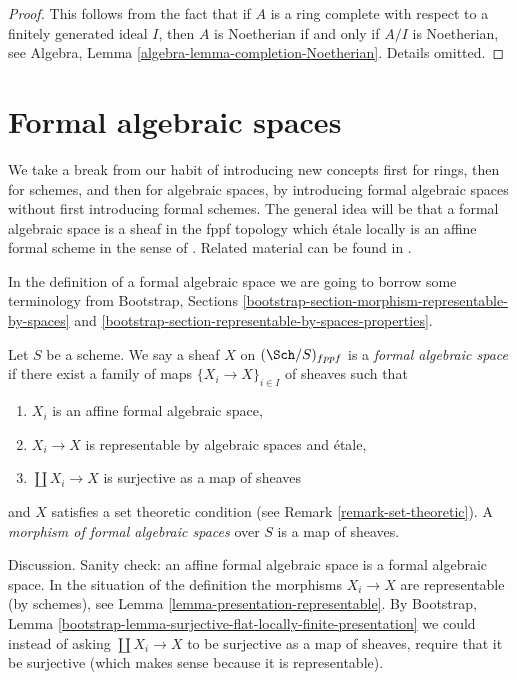 \begin{proof}
This follows from the fact that if $A$ is a ring complete with
respect to a finitely generated ideal $I$, then $A$ is Noetherian
if and only if $A/I$ is Noetherian, see
Algebra, Lemma \ref{algebra-lemma-completion-Noetherian}.
Details omitted.
\end{proof}





\section{Formal algebraic spaces}
\label{section-formal-algebraic-spaces}

\noindent
We take a break from our habit of introducing new concepts first
for rings, then for schemes, and then for algebraic spaces, by
introducing formal algebraic spaces without first introducing
formal schemes. The general idea will be that a formal algebraic space
is a sheaf in the fppf topology which \'etale locally is an
affine formal scheme in the sense of \cite{BVGD}.
Related material can be found in \cite{Yasuda}.

\medskip\noindent
In the definition of a formal algebraic space we are going to
borrow some terminology from
Bootstrap, Sections
\ref{bootstrap-section-morphism-representable-by-spaces} and
\ref{bootstrap-section-representable-by-spaces-properties}.

\begin{definition}
\label{definition-formal-algebraic-space}
Let $S$ be a scheme. We say a sheaf $X$ on $(\Sch/S)_{fppf}$ is a
{\it formal algebraic space} if there exist a family of maps
$\{X_i \to X\}_{i \in I}$ of sheaves such that
\begin{enumerate}
\item $X_i$ is an affine formal algebraic space,
\item $X_i \to X$ is representable by algebraic spaces and \'etale,
\item $\coprod X_i \to X$ is surjective as a map of sheaves
\end{enumerate}
and $X$ satisfies a set theoretic condition
(see Remark \ref{remark-set-theoretic}). A
{\it morphism of formal algebraic spaces}
over $S$ is a map of sheaves.
\end{definition}

\noindent
Discussion. Sanity check: an affine formal algebraic space is
a formal algebraic space. In the situation of the definition
the morphisms $X_i \to X$ are representable (by schemes), see
Lemma \ref{lemma-presentation-representable}.
By Bootstrap, Lemma
\ref{bootstrap-lemma-surjective-flat-locally-finite-presentation}
we could instead of asking $\coprod X_i \to X$
to be surjective as a map of sheaves, require that it be
surjective (which makes sense because it is representable).

